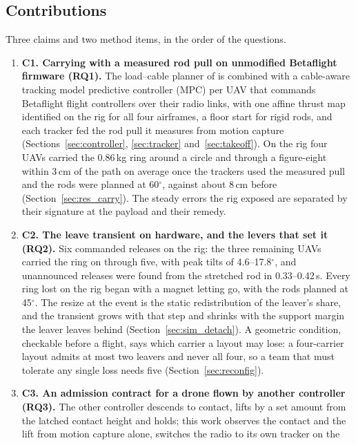 \subsection{Contributions}
\label{sec:contributions}

Three claims and two method items, in the order of the questions.
\begin{enumerate}
    \item \textbf{C1. Carrying with a measured rod pull on unmodified Betaflight firmware (RQ1).} The
    load--cable planner of \cite{tudelft} is combined with a cable-aware tracking model predictive controller
    (MPC) per UAV that commands Betaflight flight controllers over their radio links, with one affine thrust map
    identified on the rig for all four airframes, a floor start for rigid rods, and each tracker fed the rod pull
    it measures from motion capture (Sections~\ref{sec:controller}, \ref{sec:tracker} and~\ref{sec:takeoff}). On
    the rig four UAVs carried the 0.86\,kg ring around a circle and through a figure-eight within 3\,cm of the
    path on average once the trackers used the measured pull and the rods were planned at 60$^\circ$, against
    about 8\,cm before (Section~\ref{sec:res_carry}). The steady errors the rig exposed are separated by their
    signature at the payload and their remedy.
    \item \textbf{C2. The leave transient on hardware, and the levers that set it (RQ2).} Six commanded
    releases on the rig: the three remaining UAVs carried the ring on through five, with peak tilts of
    4.6--17.8$^\circ$, and unannounced releases were found from the stretched rod in 0.33--0.42\,s. Every ring
    lost on the rig began with a magnet letting go, with the rods planned at 45$^\circ$. The resize at the event
    is the static redistribution of the leaver's share, and the transient grows with that step and shrinks with
    the support margin the leaver leaves behind (Section~\ref{sec:sim_detach}). A geometric condition, checkable
    before a flight, says which carrier a layout may lose: a four-carrier layout admits at most two leavers and
    never all four, so a team that must tolerate any single loss needs five (Section~\ref{sec:reconfig}).
    \item \textbf{C3. An admission contract for a drone flown by another controller (RQ3).} The other
    controller descends to contact, lifts by a set amount from the latched contact height and holds; this work
    observes the contact and the lift from motion capture alone, switches the radio to its own tracker on the

\end{enumerate}
